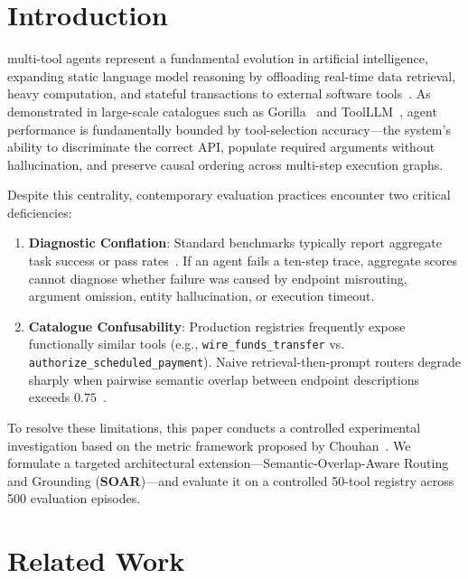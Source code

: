 \documentclass[10pt,journal,compsoc]{IEEEtran}
\begin{document}
\maketitle
\IEEEdisplaynontitleabstractindextext
\IEEEpeerreviewmaketitle

\section{Introduction}
 multi-tool agents represent a fundamental evolution in artificial intelligence, expanding static language model reasoning by offloading real-time data retrieval, heavy computation, and stateful transactions to external software tools~\cite{schick2023toolformer,yao2023react}. As demonstrated in large-scale catalogues such as Gorilla~\cite{patil2023gorilla} and ToolLLM~\cite{qin2024toolllm}, agent performance is fundamentally bounded by tool-selection accuracy---the system's ability to discriminate the correct API, populate required arguments without hallucination, and preserve causal ordering across multi-step execution graphs.

Despite this centrality, contemporary evaluation practices encounter two critical deficiencies:
\begin{enumerate}
    \item \textbf{Diagnostic Conflation}: Standard benchmarks typically report aggregate task success or pass rates~\cite{patil2025bfcl,qin2024toolllm}. If an agent fails a ten-step trace, aggregate scores cannot diagnose whether failure was caused by endpoint misrouting, argument omission, entity hallucination, or execution timeout.
    \item \textbf{Catalogue Confusability}: Production registries frequently expose functionally similar tools (e.g., \texttt{wire\_funds\_transfer} vs. \texttt{authorize\_scheduled\_payment}). Naive retrieval-then-prompt routers degrade sharply when pairwise semantic overlap between endpoint descriptions exceeds $0.75$~\cite{huang2024metatool}.
\end{enumerate}

To resolve these limitations, this paper conducts a controlled experimental investigation based on the metric framework proposed by Chouhan~\cite{chouhan2026evaluating}. We formulate a targeted architectural extension---Semantic-Overlap-Aware Routing and Grounding (\textbf{SOAR})---and evaluate it on a controlled 50-tool registry across 500 evaluation episodes.

\section{Related Work}
\end{document}
